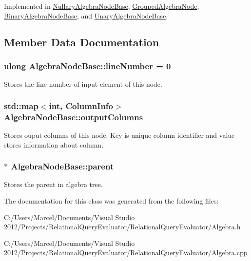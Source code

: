 Implemented in \hyperlink{class_nullary_algebra_node_base_af5a5e7f02db8509605ab852ef65b201b}{Nullary\+Algebra\+Node\+Base}, \hyperlink{class_grouped_algebra_node_a463e6303f6332fc9ed2a885e3456b58e}{Grouped\+Algebra\+Node}, \hyperlink{class_binary_algebra_node_base_a6e466b62966a9851c3c34e1fb588a496}{Binary\+Algebra\+Node\+Base}, and \hyperlink{class_unary_algebra_node_base_a26aeeaeb45f97051d618cfcceccd5949}{Unary\+Algebra\+Node\+Base}.



\subsection{Member Data Documentation}
\hypertarget{class_algebra_node_base_a4ec1eb0806465aa32681272c771a87ba}{
\subsubsection[{line\+Number}]{\setlength{\rightskip}{0pt plus 5cm}ulong Algebra\+Node\+Base\+::line\+Number = 0}}\label{class_algebra_node_base_a4ec1eb0806465aa32681272c771a87ba}
Stores the line number of input element of this node. \hypertarget{class_algebra_node_base_ac59c590aea4f109c7fab18f714c588c1}{
\subsubsection[{output\+Columns}]{\setlength{\rightskip}{0pt plus 5cm}std\+::map$<$int, {\bf Column\+Info}$>$ Algebra\+Node\+Base\+::output\+Columns}}\label{class_algebra_node_base_ac59c590aea4f109c7fab18f714c588c1}
Stores ouput columns of this node. Key is unique column identifier and value stores information about column. \hypertarget{class_algebra_node_base_a5b2834cce900dec172763d4ef4b38f66}{
\subsubsection[{parent}]{$\ast$ Algebra\+Node\+Base\+::parent}}\label{class_algebra_node_base_a5b2834cce900dec172763d4ef4b38f66}
Stores the parent in algebra tree. 

The documentation for this class was generated from the following files\+:\begin{DoxyCompactItemize}
\item 
C\+:/\+Users/\+Marcel/\+Documents/\+Visual Studio 2012/\+Projects/\+Relational\+Query\+Evaluator/\+Relational\+Query\+Evaluator/Algebra.\+h\item 
C\+:/\+Users/\+Marcel/\+Documents/\+Visual Studio 2012/\+Projects/\+Relational\+Query\+Evaluator/\+Relational\+Query\+Evaluator/Algebra.\+cpp\end{DoxyCompactItemize}
